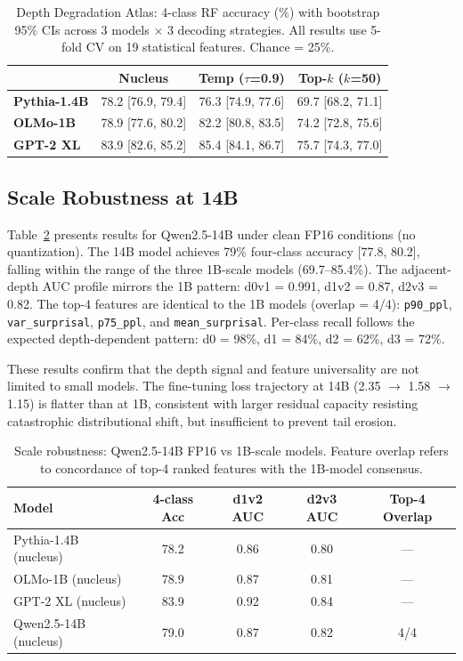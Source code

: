 \documentclass[11pt,a4paper]{article}
\begin{document}
\begin{table}[t]
\centering
\caption{Depth Degradation Atlas: 4-class RF accuracy (\%) with bootstrap 95\% CIs across 3 models $\times$ 3 decoding strategies. All results use 5-fold CV on 19 statistical features. Chance = 25\%.}
\label{tab:atlas}
\small
\begin{tabular}{lccc}
\toprule
& \textbf{Nucleus} & \textbf{Temp ($\tau$=0.9)} & \textbf{Top-$k$ ($k$=50)} \\
\midrule
\textbf{Pythia-1.4B} & 78.2 \scriptsize{[76.9, 79.4]} & 76.3 \scriptsize{[74.9, 77.6]} & 69.7 \scriptsize{[68.2, 71.1]} \\
\textbf{OLMo-1B}     & 78.9 \scriptsize{[77.6, 80.2]} & 82.2 \scriptsize{[80.8, 83.5]} & 74.2 \scriptsize{[72.8, 75.6]} \\
\textbf{GPT-2 XL}    & 83.9 \scriptsize{[82.6, 85.2]} & 85.4 \scriptsize{[84.1, 86.7]} & 75.7 \scriptsize{[74.3, 77.0]} \\
\bottomrule
\end{tabular}
\end{table}

\subsection{Scale Robustness at 14B}

Table~\ref{tab:14b} presents results for Qwen2.5-14B under clean FP16 conditions (no quantization). The 14B model achieves 79\% four-class accuracy [77.8, 80.2], falling within the range of the three 1B-scale models (69.7--85.4\%). The adjacent-depth AUC profile mirrors the 1B pattern: d0v1 = 0.991, d1v2 = 0.87, d2v3 = 0.82. The top-4 features are identical to the 1B models (overlap = 4/4): \texttt{p90\_ppl}, \texttt{var\_surprisal}, \texttt{p75\_ppl}, and \texttt{mean\_surprisal}. Per-class recall follows the expected depth-dependent pattern: d0 = 98\%, d1 = 84\%, d2 = 62\%, d3 = 72\%.

These results confirm that the depth signal and feature universality are not limited to small models. The fine-tuning loss trajectory at 14B (2.35 $\to$ 1.58 $\to$ 1.15) is flatter than at 1B, consistent with larger residual capacity resisting catastrophic distributional shift, but insufficient to prevent tail erosion.

\begin{table}[t]
\centering
\caption{Scale robustness: Qwen2.5-14B FP16 vs 1B-scale models. Feature overlap refers to concordance of top-4 ranked features with the 1B-model consensus.}
\label{tab:14b}
\small
\begin{tabular}{lcccc}
\toprule
\textbf{Model} & \textbf{4-class Acc} & \textbf{d1v2 AUC} & \textbf{d2v3 AUC} & \textbf{Top-4 Overlap} \\
\midrule
Pythia-1.4B (nucleus) & 78.2 & 0.86 & 0.80 & --- \\
OLMo-1B (nucleus)     & 78.9 & 0.87 & 0.81 & --- \\
GPT-2 XL (nucleus)    & 83.9 & 0.92 & 0.84 & --- \\
\midrule
Qwen2.5-14B (nucleus) & 79.0 & 0.87 & 0.82 & 4/4 \\
\bottomrule
\end{tabular}
\end{table}
\end{document}
